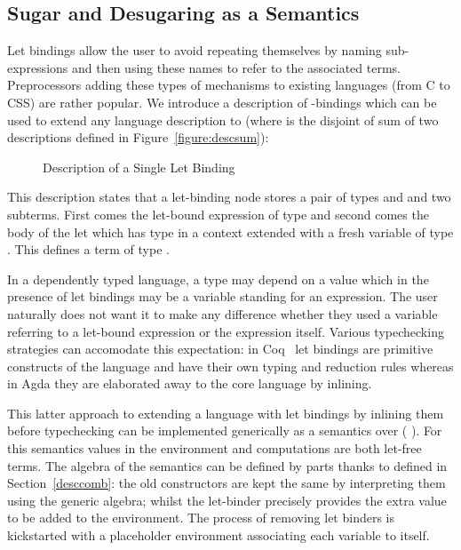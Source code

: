 \subsection{Sugar and Desugaring as a Semantics}\label{section:letbinding}

Let bindings allow the user to avoid repeating themselves by naming
sub-expressions and then using these names to refer to the associated
terms. Preprocessors adding these types of mechanisms to existing
languages (from C to CSS) are rather popular. We introduce a
description of -bindings which can be used to extend any
language description  to    (where 
is the disjoint of sum of two descriptions defined in Figure~\ref{figure:descsum}):

\begin{figure}[h]
\caption{Description of a Single Let Binding}
\end{figure}

This description states that a let-binding node stores a pair of types
\AB{$\sigma$} and \AB{$\tau$} and two subterms. First comes the let-bound
expression of type \AB{$\sigma$} and second comes the body of the let which
has type \AB{$\tau$} in a context extended with a fresh variable of type
\AB{$\sigma$}. This defines a term of type \AB{$\tau$}.

In a dependently typed language, a type may depend on a value which
in the presence of let bindings may be a variable standing for an
expression. The user naturally does not want it to make any difference
whether they used a variable referring to a let-bound expression or
the expression itself. Various typechecking strategies can accomodate
this expectation: in Coq~\cite{Coq:manual} let bindings are primitive
constructs of the language and have their own typing and reduction
rules whereas in Agda they are elaborated away to the core language
by inlining.

This latter approach to extending a language  with let bindings
by inlining them before typechecking can be implemented generically as
a semantics over (  ). For this semantics values
in the environment and computations are both let-free terms. The algebra
of the semantics can be defined by parts thanks to  defined in
Section~\ref{desccomb}: the old constructors are kept the same by interpreting
them using the generic  algebra;
whilst the let-binder precisely provides the extra value to be added to the
environment. The process of removing let binders is kickstarted with a
placeholder environment associating each variable to itself.

